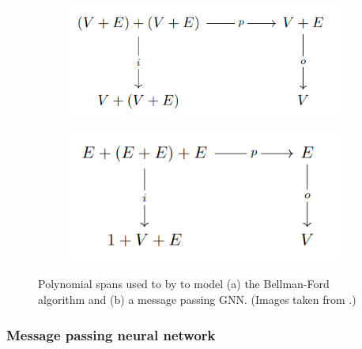 \documentclass[11pt,a4paper,openright,twoside]{report}
\theoremstyle{plain}
\theoremstyle{definition}
\begin{document}
\begin{figure}[h]
  \begin{center}
    \begin{subfigure}{0.45\textwidth}
      \includegraphics[width=\textwidth]{figures/poly_span_bellman_ford.png}
      \caption{}
    \end{subfigure}
    \begin{subfigure}{0.4\textwidth}
      \includegraphics[width=\textwidth]{figures/poly_span_message_passing.png}
      \caption{}
    \end{subfigure}            
    \caption[Bellman-Ford algorithm and message passing GNN]{Polynomial spans used to by \cite{dudzik2022graph} to model (a) the Bellman-Ford algorithm and (b) a message passing GNN. (Images taken from \cite{dudzik2022graph}.)}
    \label{fig: polyspans}
  \end{center}
\end{figure}

\subsubsection{Message passing neural network}
\end{document}
